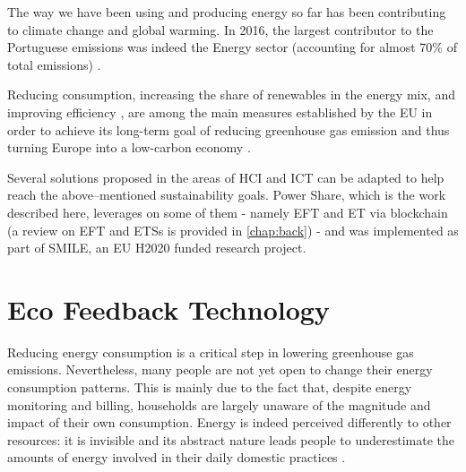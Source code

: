 \label{chap:intro}
\cleardoublepage
The way we have been using and producing energy so far has been contributing to climate change and global warming. In 2016, the largest contributor to the Portuguese emissions was indeed the Energy sector (accounting for almost 70\% of total emissions)\cite{NacionalReport} .


Reducing consumption, increasing the share of renewables in the energy mix, and improving efficiency \cite{Europa1, Europa2, Europa3}, are among the main measures established by the \ac{EU} in order to achieve its long-term goal of reducing greenhouse gas emission and thus turning Europe into a low-carbon economy \cite{Europa2050}.


Several solutions proposed in the areas of \ac{HCI} and \ac{ICT} can be adapted to help reach the above--mentioned sustainability goals. Power Share, which is the work described here, leverages on some of them - namely \ac{EFT} and \ac{ET} via blockchain (a review on \ac{EFT} and \acp{ETS} is provided in \cref{chap:back}) - and was implemented as part of \ac{SMILE}, an EU H2020 funded research project.




\section{Eco Feedback Technology}

Reducing energy consumption is a critical step in lowering greenhouse gas emissions. Nevertheless, many people are not yet open to change their energy consumption patterns. This is mainly due to the fact that, despite energy monitoring and billing, households are largely unaware of the magnitude and impact of their own consumption. Energy is indeed perceived differently to other resources: it is invisible and its abstract nature leads people to underestimate the amounts of energy involved in their daily domestic practices \cite{ReducingDomesticEnergy}.


